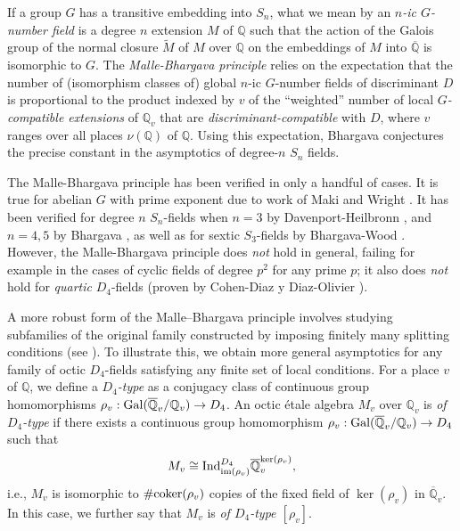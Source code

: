 \documentclass[10pt]{article}
\theoremstyle{plain}
\theoremstyle{definition}
\theoremstyle{remark}
\def\Gal{{\rm Gal}}
\def\Ind{{\rm Ind}}
\def\im{{\rm im}}
\def\coker{{\rm coker}}
\def\bQ{{\mathbb Q}}
\def\bQ{{\mathbb Q}}
\begin{document}
\medskip

If a group $G$ has a transitive embedding into $S_n$, what we mean by an {\em $n$-ic
$G$-number field} is a degree $n$ extension $M$ of $\bQ$ such that the action of the Galois group of the
normal closure $\widetilde{M}$ of $M$ over $\bQ$ 
on the embeddings of $M$ into $\overline{\bQ}$ is isomorphic to
$G$. The {\em Malle-Bhargava principle} relies on the expectation that the
number of (isomorphism classes of) global $n$-ic $G$-number fields of
discriminant $D$ is proportional to the product indexed by $v$ of the ``weighted'' number of local
{\em $G$-compatible extensions} of $\bQ_v$ that are {\em discriminant-compatible}
with $D$, where $v$ ranges over all places $\nu(\bQ)$ of $\bQ$. Using this expectation, Bhargava \cite{MR2354798} conjectures the precise constant in the asymptotics of degree-$n$ $S_n$ fields. 

The Malle-Bhargava principle has
been verified in only a handful of cases. It is true for abelian $G$
with prime exponent due to work of Maki \cite{MR791087, MR1200974} and Wright
\cite{MR969545}.
It has been verified for degree $n$ $S_n$-fields when $n = 3$ by
Davenport-Heilbronn \cite{MR491593}, and $n = 4,5$ by
Bhargava \cite{MR2183288, MR2745272}, as well as for sextic
$S_3$-fields by Bhargava-Wood \cite{MR2373587}. However, the Malle-Bhargava principle does {\em not} hold in general, failing for example in the cases of cyclic fields of degree $p^2$ for any prime $p$; it also does {\em not} hold for
 {\em quartic} $D_4$-fields (proven by Cohen-Diaz y Diaz-Olivier
\cite{MR1918290}). 



A more robust form of the Malle--Bhargava principle involves studying subfamilies of the original family constructed by imposing finitely many splitting conditions (see \cite{STCubicInv}).
To illustrate this, we obtain more general asymptotics for any family of octic $D_4$-fields satisfying any finite set of local conditions. For a place $v$ of $\bQ$, we define a {\em
  $D_4$-type} as a conjugacy class of continuous group homomorphisms
$\rho_v:\Gal(\overline{\bQ}_v/\bQ_v) \rightarrow D_4$.  An octic
\'etale algebra $M_v$ over $\bQ_v$ is {\em of $D_4$-type} if there
exists a continuous group homomorphism
$\rho_v:\Gal(\overline{\bQ}_v/\bQ_v) \rightarrow D_4$ such that $$M_v
\cong \Ind_{\im(\rho_v)}^{D_4} \overline{\bQ}_v^{\ker(\rho_v)},$$
i.e., $M_v$ is isomorphic to $\#\coker(\rho_v)$ copies of the fixed
field of $\ker(\rho_v)$ in $\overline{\bQ}_v$. In this case, we
further say that $M_v$ is {\em of $D_4$-type $[\rho_v]$}.
\end{document}
